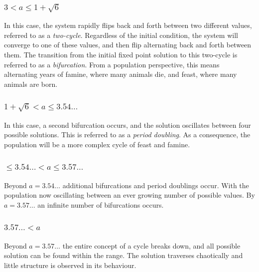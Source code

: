 \subsubsection{$ 3 < a \leq 1 + \sqrt{6}$}
In this case, the system rapidly flips back and forth between two different values, referred to as a {\it two-cycle}. Regardless of the initial condition, the system will converge to one of these values, and then flip alternating back and forth between them. The transition from the initial fixed point solution to this two-cycle is referred to as a {\it bifurcation}. From a population perspective, this means alternating years of famine, where many animals die, and feast, where many animals are born.

\subsubsection{$1 + \sqrt{6} < a \leq 3.54\hdots$}
In this case, a second bifurcation occurs, and the solution oscillates between four possible solutions. This is referred to as a {\it period doubling}. As a consequence, the population will be a more complex cycle of feast and famine.

\subsubsection{$\leq 3.54\hdots < a \leq 3.57\hdots$}
Beyond $a = 3.54\hdots$ additional bifurcations and period doublings occur. With the population now oscillating between an ever growing number of possible values. By $a = 3.57\hdots$ an infinite number of bifurcations occurs. 

\subsubsection{$3.57\hdots < a $}
Beyond $a = 3.57\hdots$ the entire concept of a cycle breaks down, and all possible solution can be found within the range. The solution traverses chaotically and little structure is observed in its behaviour. 

